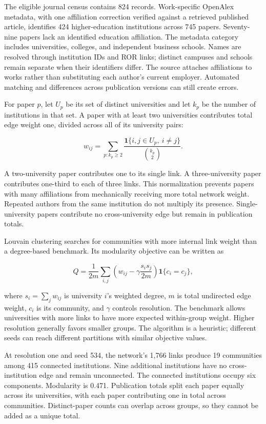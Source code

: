 The eligible journal census contains 824 records. Work-specific OpenAlex
metadata, with one affiliation correction verified against a retrieved
published article, identifies 424 higher-education institutions across
745 papers. Seventy-nine papers lack an identified education
affiliation. The metadata category includes universities, colleges, and
independent business schools. Names are resolved through institution IDs
and ROR links; distinct campuses and schools remain separate when their
identifiers differ. The source attaches affiliations to works rather
than substituting each author's current employer. Automated matching and
differences across publication versions can still create errors.

For paper \(p\), let \(U_p\) be its set of distinct universities and let
\(k_p\) be the number of institutions in that set. A paper with at least
two universities contributes total edge weight one, divided across all
of its university pairs:

\[
w_{ij}=\sum_{p:k_p\geq2}\frac{\mathbf{1}\{i,j\in U_p,\ i\ne j\}}{\binom{k_p}{2}}.
\]

A two-university paper contributes one to its single link. A
three-university paper contributes one-third to each of three links.
This normalization prevents papers with many affiliations from
mechanically receiving more total network weight. Repeated authors from
the same institution do not multiply its presence. Single-university
papers contribute no cross-university edge but remain in publication
totals.

Louvain clustering searches for communities with more internal link
weight than a degree-based benchmark. Its modularity objective can be
written as

\[
Q=\frac{1}{2m}\sum_{i,j}\left(w_{ij}-\gamma\frac{s_i s_j}{2m}\right)\mathbf{1}\{c_i=c_j\},
\]

where \(s_i=\sum_jw_{ij}\) is university \(i\)'s weighted degree, \(m\)
is total undirected edge weight, \(c_i\) is its community, and
\(\gamma\) controls resolution. The benchmark allows universities with
more links to have more expected within-group weight. Higher resolution
generally favors smaller groups. The algorithm is a heuristic; different
seeds can reach different partitions with similar objective values.

At resolution one and seed 534, the network's 1,766 links produce 19
communities among 415 connected institutions. Nine additional
institutions have no cross-institution edge and remain unconnected. The
connected institutions occupy six components. Modularity is 0.471.
Publication totals split each paper equally across its universities,
with each paper contributing one in total across communities.
Distinct-paper counts can overlap across groups, so they cannot be added
as a unique total.

